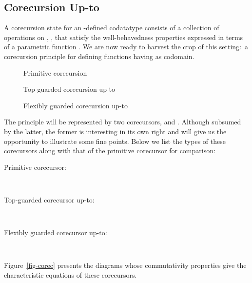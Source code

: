 \documentclass[preprint,draft]
{sigplanconf}
\newcommand{\<}{\langle}
\renewcommand{\>}{\rangle}
\begin{document}
\subsection{Corecursion Up-to}
\label{sec-corec-princ}

A corecursion state  for an -defined codatatype  consists of a collection of operations
on , , that satisfy the well-behavedness properties
expressed in terms of a parametric function .
We are now ready to harvest the crop of this setting:\ a corecursion principle
for defining functions having  as codomain.

\begin{figure*}
        \centering
        \begin{subfigure}[b]{0.175\textwidth}
\centering

                \caption{Primitive corecursion}
                \label{fig-prim-corec}
        \end{subfigure}\quad
        \begin{subfigure}[b]{0.325\textwidth}
\centering

                \caption{Top-guarded corecursion up-to}
                \label{fig-top-guarded-corec}
        \end{subfigure}
        \quad
        \begin{subfigure}[b]{0.425\textwidth}
\centering

                \caption{Flexibly guarded corecursion up-to}
                \label{fig-flexibly-guarded-corec}
        \end{subfigure}
        \caption{The corecursors}\label{fig-corec}
\end{figure*}


The principle will be represented by two corecursors,  and . Although
subsumed by the latter, the former is interesting in its own right and will
give us the opportunity to illustrate some fine points. Below
we list the types of these corecursors
along with that of the primitive corecursor for comparison:
\begin{description}
\item[Primitive corecursor:]
\ \\\hspace*{3ex}

\item[Top-guarded corecursor up-to:]
\ \\\hspace*{3ex}

\item[Flexibly guarded corecursor up-to:]
\ \\\hspace*{3ex}

\end{description}
Figure~\ref{fig-corec} presents the diagrams whose commutativity properties give
the characteristic equations of these corecursors.
\end{document}
